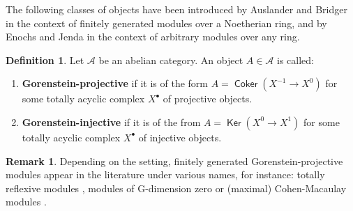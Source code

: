 \documentclass[oneside, a4paper,reqno]{amsart}
\numberwithin{equation}{section}
\theoremstyle{definition}
\newtheorem{defn}[thm]{Definition}
\newtheorem{rem}[thm]{Remark}
\begin{document}
The following classes of objects have been introduced by Auslander
and Bridger \cite{ABr} in the context of finitely generated modules
over a Noetherian ring, and by Enochs and Jenda \cite{EJ} in the
context of arbitrary modules over any ring.

\begin{defn} Let ${\mathscr A}$ be an abelian category. An object $A \in {\mathscr A}$
is  called:
\begin{enumerate}
\item {\bf Gorenstein-projective} if it is of
the form $A=\operatorname*{\mathsf{Coker}} (X^{-1}\to X^0)$ for some totally acyclic complex
$X^{\bullet}$ of projective objects.
\item {\bf Gorenstein-injective} if it is of the from $A=\operatorname*{\mathsf{Ker}}
(X^{0}\to X^1)$ for some totally acyclic complex $X^{\bullet}$ of
injective objects.
\end{enumerate}
\end{defn}

\begin{rem} Depending on the setting, finitely generated Gorenstein-projective modules
appear in the literature under various names, for instance: totally
reflexive modules \cite{JS}, modules of G-dimension zero \cite{ABr,
Yoshino} or (maximal) Cohen-Macaulay modules \cite{AR:cm, BR}.
\end{rem}
\end{document}
